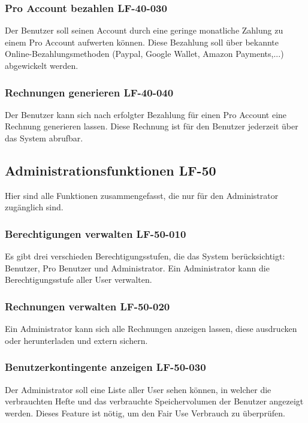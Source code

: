 \documentclass[12pt,a4paper,oneside,ngerman]{scrartcl}
\begin{document}
\subsubsection{Pro Account bezahlen \hfill LF-40-030}
Der Benutzer soll seinen Account durch eine geringe monatliche Zahlung zu einem Pro Account aufwerten können. Diese Bezahlung soll über bekannte Online-Bezahlungsmethoden (Paypal, Google Wallet, Amazon Payments,...) abgewickelt werden.

\subsubsection{Rechnungen generieren \hfill LF-40-040}
Der Benutzer kann sich nach erfolgter Bezahlung für einen Pro Account eine Rechnung generieren lassen. Diese Rechnung ist für den Benutzer jederzeit über das System abrufbar.

\subsection[Administrationsfunktionen]{Administrationsfunktionen \hfill LF-50}
Hier sind alle Funktionen zusammengefasst, die nur für den Administrator zugänglich sind.

\subsubsection{Berechtigungen verwalten \hfill LF-50-010}
Es gibt drei verschieden Berechtigungsstufen, die das System berücksichtigt: Benutzer, Pro Benutzer und Administrator. Ein Administrator kann die Berechtigungsstufe aller User verwalten.

\subsubsection{Rechnungen verwalten \hfill LF-50-020}
Ein Administrator kann sich alle Rechnungen anzeigen lassen, diese ausdrucken oder herunterladen und extern sichern.

\subsubsection{Benutzerkontingente anzeigen \hfill LF-50-030}
Der Administrator soll eine Liste aller User sehen können, in welcher die verbrauchten Hefte und das verbrauchte Speichervolumen der Benutzer angezeigt werden. Dieses Feature ist nötig, um den Fair Use Verbrauch zu überprüfen.
\end{document}
